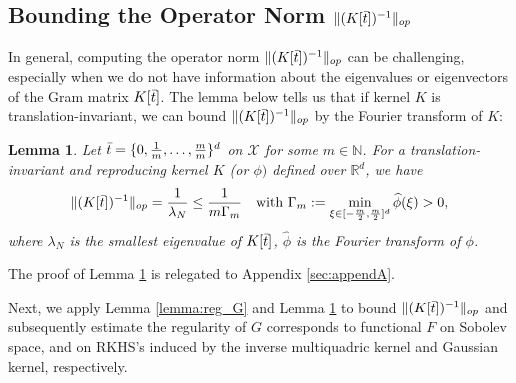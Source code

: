 \documentclass{article}
\def\NN{\mathbb N}
\def\RR{\mathbb R}
\numberwithin{equation}{section}
\newtheorem{lemma}[theorem]{Lemma}
\begin{document}
\subsection{Bounding the Operator Norm $\|(K[\Bar{t}])^{-1}\|_{op}$}\label{subsec:norm}
In general, computing the operator norm $\|(K[\Bar{t}])^{-1}\|_{op}$ can be challenging, especially when we do not have information about the eigenvalues or eigenvectors of the Gram matrix $K[\Bar{t}]$. 
The lemma below tells us that if kernel $K$ is translation-invariant, we can bound $\|(K[\Bar{t}])^{-1}\|_{op}$ by the Fourier transform of $K$: 


\begin{lemma}\label{lemma:norminverse}
    Let $\Bar{t}=\{ 0, \frac{1}{m},\ldots, \frac{m}{m}\}^d$ on $\mathcal{X}$ for some $m\in \NN$. For a translation-invariant and reproducing kernel $K$ (or $\phi)$ defined over $\RR^d$, we have \begin{equation}
        \|(K[\Bar{t}])^{-1}\|_{op} = \frac{1}{\lambda_{N}} \leq  \frac{1}{m\Gamma_m} \quad \text{with } \Gamma_m :=  \min_{\xi \in [-\frac{m}{2},\frac{m}{2}]^d} \widehat{\phi}(\xi)> 0,
    \end{equation}
    where $\lambda_{N}$ is the smallest eigenvalue of $K[\Bar{t}]$, $\widehat{\phi}$ is the Fourier transform of $\phi$.
\end{lemma}
The proof of Lemma \ref{lemma:norminverse} is relegated to Appendix \ref{sec:appendA}.

Next, we apply Lemma \ref{lemma:reg_G} and Lemma \ref{lemma:norminverse} to bound $\|(K[\Bar{t}])^{-1}\|_{op}$ and subsequently estimate the regularity of $G$ corresponds to functional $F$ on Sobolev space, and on RKHS's induced by the inverse multiquadric kernel and Gaussian kernel, respectively. 
\end{document}
